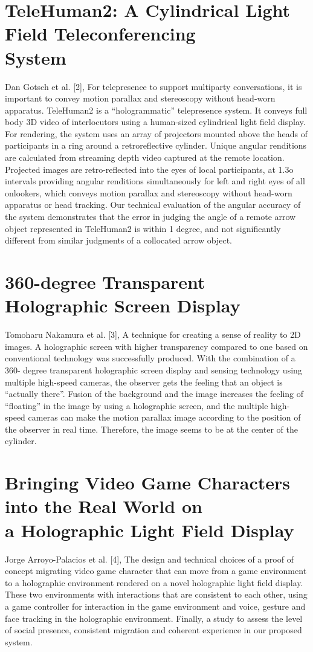 \documentclass{fisatproject}
\begin{document}
\section{\normalsize TeleHuman2: A Cylindrical Light Field Teleconferencing \\ System }
\par Dan Gotsch et al. [2],  For telepresence to support multiparty conversations, it is important to convey motion parallax and stereoscopy without head-worn apparatus. TeleHuman2 is a “hologrammatic” telepresence system. It conveys full body 3D video of interlocutors using a human-sized cylindrical light field display. For rendering, the system uses an array of projectors mounted above the heads of participants in a ring around a retroreflective cylinder. Unique angular renditions are calculated from streaming depth video captured at the remote location. Projected images are retro-reflected into the eyes of local participants, at 1.3o intervals providing angular renditions simultaneously for left and right eyes of all onlookers, which conveys motion parallax and stereoscopy without head-worn apparatus or head tracking. Our technical evaluation of the angular accuracy of the system demonstrates that the error in judging the angle of a remote arrow object represented in TeleHuman2 is within 1 degree, and not significantly different from similar judgments of a collocated arrow object.
\section{\normalsize 360-degree Transparent Holographic Screen Display}
\par Tomoharu Nakamura et al. [3], A technique for creating a sense of reality to 2D images. A holographic screen with higher transparency compared to one based on conventional technology was successfully produced. With the combination of a 360- degree transparent holographic screen display and sensing technology using multiple high-speed cameras, the observer gets the feeling that an object is “actually there”. Fusion of the background and the image increases the feeling of “floating” in the image by using a holographic screen, and the multiple high- speed cameras can make the motion parallax image according to the position of the observer in real time. Therefore, the image seems to be at the center of the cylinder.
\section{\normalsize Bringing Video Game Characters into the Real World on \\ a Holographic Light Field Display}
\par Jorge Arroyo-Palacios et al. [4],   The design and technical choices of a proof of concept migrating video game character that can move from a game environment to a holographic environment rendered on a novel holographic light field display.  These two environments with interactions that are consistent to each other, using a game controller for interaction in the game environment and voice, gesture and face tracking in the holographic environment. Finally,  a study to assess the level of social presence, consistent migration and coherent experience in our proposed system.
\end{document}
